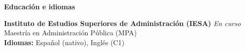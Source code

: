 \documentclass[11pt]{article}
\begin{document}
\vspace{8pt}
\begin{center}
    \textbf{Educación e idiomas}
\end{center}
\vspace{-4pt}
\textbf{Instituto de Estudios Superiores de Administración (IESA)} \hfill \textit{En curso} \\
Maestría en Administración Pública (MPA) \\
\textbf{Idiomas:} Español (nativo), Inglés (C1)
\end{document}

